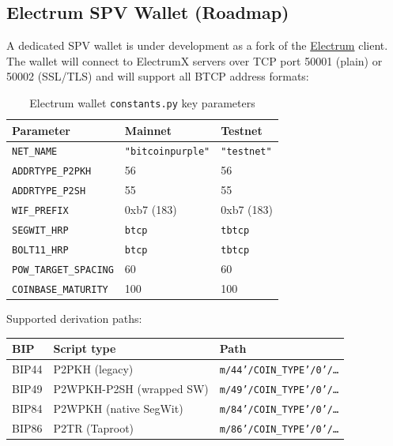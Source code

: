 \documentclass[12pt, a4paper]{article}
\begin{document}
\subsection{Electrum SPV Wallet (Roadmap)}
\label{ssec:electrum}

A dedicated SPV wallet is under development as a fork of the
\href{https://electrum.org}{Electrum} client.  The wallet will connect to
ElectrumX servers over TCP port 50001 (plain) or 50002 (SSL/TLS) and will
support all BTCP address formats:

\begin{table}[h!]
\centering
\caption{Electrum wallet \texttt{constants.py} key parameters}
\begin{tabular}{@{}lll@{}}
\toprule
\textbf{Parameter} & \textbf{Mainnet} & \textbf{Testnet} \\
\midrule
\texttt{NET\_NAME}              & \texttt{"bitcoinpurple"} & \texttt{"testnet"} \\
\texttt{ADDRTYPE\_P2PKH}        & 56  & 56 \\
\texttt{ADDRTYPE\_P2SH}         & 55  & 55 \\
\texttt{WIF\_PREFIX}            & 0xb7 (183) & 0xb7 (183) \\
\texttt{SEGWIT\_HRP}            & \texttt{btcp}  & \texttt{tbtcp} \\
\texttt{BOLT11\_HRP}            & \texttt{btcp}  & \texttt{tbtcp} \\
\texttt{POW\_TARGET\_SPACING}   & 60  & 60 \\
\texttt{COINBASE\_MATURITY}     & 100 & 100 \\
\bottomrule
\end{tabular}
\end{table}

Supported derivation paths:

\begin{center}
\begin{tabular}{@{}lll@{}}
\toprule
\textbf{BIP} & \textbf{Script type} & \textbf{Path} \\
\midrule
BIP44 & P2PKH (legacy)          & \texttt{m/44'/COIN\_TYPE'/0'/\ldots} \\
BIP49 & P2WPKH-P2SH (wrapped SW) & \texttt{m/49'/COIN\_TYPE'/0'/\ldots} \\
BIP84 & P2WPKH (native SegWit)  & \texttt{m/84'/COIN\_TYPE'/0'/\ldots} \\
BIP86 & P2TR (Taproot)          & \texttt{m/86'/COIN\_TYPE'/0'/\ldots} \\
\bottomrule
\end{tabular}
\end{center}
\end{document}
